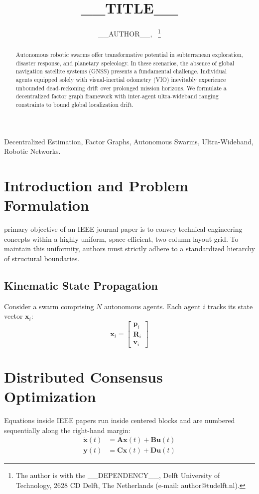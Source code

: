 \documentclass[10pt, journal]{IEEEtran}
\title{__TITLE__}
\author{__AUTHOR__,~\IEEEmembership{Member,~IEEE}%
\thanks{The author is with the __DEPENDENCY__, Delft University of Technology, 2628 CD Delft, The Netherlands (e-mail: author@tudelft.nl).}}
\begin{document}
\maketitle

\begin{abstract}
Autonomous robotic swarms offer transformative potential in subterranean exploration, disaster response, and planetary speleology. In these scenarios, the absence of global navigation satellite systems (GNSS) presents a fundamental challenge. Individual agents equipped solely with visual-inertial odometry (VIO) inevitably experience unbounded dead-reckoning drift over prolonged mission horizons. We formulate a decentralized factor graph framework with inter-agent ultra-wideband ranging constraints to bound global localization drift.
\end{abstract}

\begin{IEEEkeywords}
Decentralized Estimation, Factor Graphs, Autonomous Swarms, Ultra-Wideband, Robotic Networks.
\end{IEEEkeywords}

\section{Introduction and Problem Formulation}
 primary objective of an IEEE journal paper is to convey technical engineering concepts within a highly uniform, space-efficient, two-column layout grid. To maintain this uniformity, authors must strictly adhere to a standardized hierarchy of structural boundaries.

\subsection{Kinematic State Propagation}
Consider a swarm comprising $N$ autonomous agents. Each agent $i$ tracks its state vector $\mathbf{x}_i$:
\begin{equation}
	\mathbf{x}_i = \begin{bmatrix} \mathbf{p}_i \\ \mathbf{R}_i \\ \mathbf{v}_i \end{bmatrix}
\end{equation}

\section{Distributed Consensus Optimization}
Equations inside IEEE papers run inside centered blocks and are numbered sequentially along the right-hand margin:
\begin{align}
	\dot{\mathbf{x}}(t) &= \mathbf{A}\mathbf{x}(t) + \mathbf{B}\mathbf{u}(t) \label{eq:statespace} \\
	\mathbf{y}(t)       &= \mathbf{C}\mathbf{x}(t) + \mathbf{D}\mathbf{u}(t) \label{eq:output}
\end{align}
\end{document}
